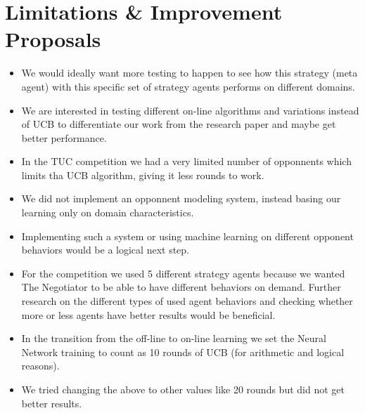 \documentclass[12pt]{article}
\numberwithin{equation}{section}
\begin{document}
	\section{Limitations \& Improvement Proposals}		\label{sec:limitations_improvements}
	
		\begin{itemize}
			\item We would ideally want more testing to happen to see how this strategy (meta agent) with this specific set of strategy agents performs on different domains.
			\item We are interested in testing different on-line algorithms and variations instead of UCB to differentiate our work from the research paper \cite{meta_agent_paper} and maybe get better performance.
			\item In the TUC competition we had a very limited number of opponnents which limits tha UCB algorithm, giving it less rounds to work.
			\item We did not implement an opponnent modeling system, instead basing our learning only on domain characteristics.
			\item Implementing such a system or using machine learning on different opponent behaviors would be a logical next step.
			\item For the competition we used 5 different strategy agents because we wanted The Negotiator to be able to have different behaviors on demand. Further research on the different types of used agent behaviors and checking whether more or less agents have better results would be beneficial. 
			\item In the transition from the off-line to on-line learning we set the Neural Network training to count as 10 rounds of UCB (for arithmetic and logical reasons).
			\item We tried changing the above to other values like 20 rounds but did not get better results.
		\end{itemize}

	
	
\end{document}
